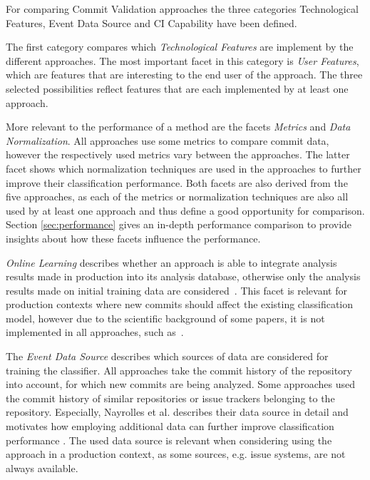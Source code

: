 For comparing Commit Validation approaches the three categories Technological Features, Event Data Source and CI Capability have been defined.

The first category compares which \textit{Technological Features} are implement by the different approaches. The most important facet in this category is \textit{User Features}, which are features that are interesting to the end user of the approach. The three selected possibilities reflect features that are each implemented by at least one approach.

More relevant to the performance of a method are the facets \textit{Metrics} and \textit{Data Normalization}. All approaches use some metrics to compare commit data, however the respectively used metrics vary between the approaches.
The latter facet shows which normalization techniques are used in the approaches to further improve their classification performance.
Both facets are also derived from the five approaches, as each of the metrics or normalization techniques are also all used by at least one approach and thus define a good opportunity for comparison. Section \ref{sec:performance} gives an in-depth performance comparison to provide insights about how these facets influence the performance.%

\textit{Online Learning} describes whether an approach is able to integrate analysis results made in production into its analysis database, otherwise only the analysis results made on initial training data are considered~\cite{MAL-018}. This facet is relevant for production contexts where new commits should affect the existing classification model, however due to the scientific background of some papers, it is not implemented in all approaches, such as~\cite{Kamei2013}.

The \textit{Event Data Source} describes which sources of data are considered for training the classifier. All approaches take the commit history of the repository into account, for which new commits are being analyzed. Some approaches used the commit history of similar repositories or issue trackers belonging to the repository.
Especially, Nayrolles et al. describes their data source in detail and motivates how employing additional data can further improve classification performance \cite{Nayrolles2018}. The used data source is relevant when considering using the approach in a production context, as some sources, e.g. issue systems, are not always available. 

